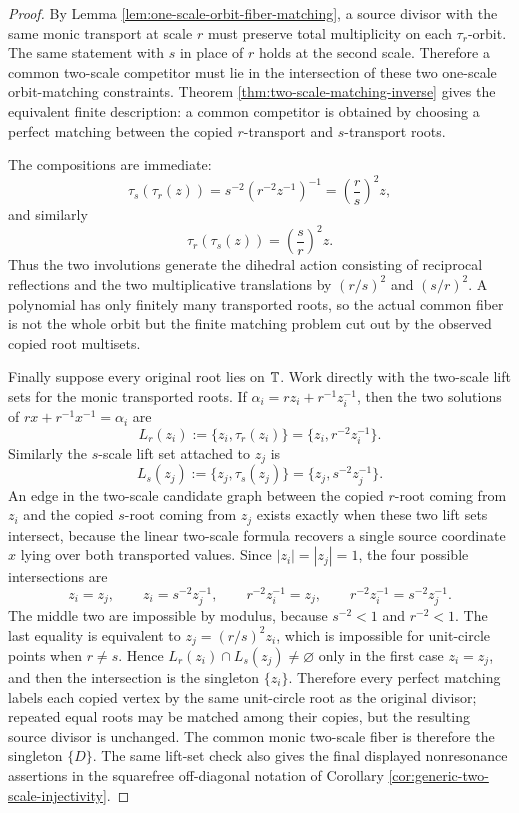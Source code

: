 \begin{proof}
By Lemma \ref{lem:one-scale-orbit-fiber-matching}, a source divisor
with the same monic transport at scale \(r\) must preserve total
multiplicity on each \(\tau_r\)-orbit.  The same statement with \(s\)
in place of \(r\) holds at the second scale.  Therefore a common
two-scale competitor must lie in the intersection of these two
one-scale orbit-matching constraints.  Theorem
\ref{thm:two-scale-matching-inverse} gives the equivalent finite
description: a common competitor is obtained by choosing a perfect
matching between the copied \(r\)-transport and \(s\)-transport roots.

The compositions are immediate:
\[
\tau_s(\tau_r(z))
=s^{-2}\left(r^{-2}z^{-1}\right)^{-1}
=\left(\frac r s\right)^2z,
\]
and similarly
\[
\tau_r(\tau_s(z))=\left(\frac s r\right)^2z.
\]
Thus the two involutions generate the dihedral action consisting of
reciprocal reflections and the two multiplicative translations by
\((r/s)^2\) and \((s/r)^2\).  A polynomial has only finitely many
transported roots, so the actual common fiber is not the whole orbit
but the finite matching problem cut out by the observed copied root
multisets.

Finally suppose every original root lies on \(\mathbb{T}\).  Work directly
with the two-scale lift sets for the monic transported roots.  If
\(\alpha_i=rz_i+r^{-1}z_i^{-1}\), then the two solutions of
\(rx+r^{-1}x^{-1}=\alpha_i\) are
\[
L_r(z_i):=\{z_i,\tau_r(z_i)\}
       =\{z_i,r^{-2}z_i^{-1}\}.
\]
Similarly the \(s\)-scale lift set attached to \(z_j\) is
\[
L_s(z_j):=\{z_j,\tau_s(z_j)\}
       =\{z_j,s^{-2}z_j^{-1}\}.
\]
An edge in the two-scale candidate graph between the copied
\(r\)-root coming from \(z_i\) and the copied \(s\)-root coming from
\(z_j\) exists exactly when these two lift sets intersect, because the
linear two-scale formula recovers a single source coordinate \(x\)
lying over both transported values.  Since \(|z_i|=|z_j|=1\), the four
possible intersections are
\[
z_i=z_j,\qquad
z_i=s^{-2}z_j^{-1},\qquad
r^{-2}z_i^{-1}=z_j,\qquad
r^{-2}z_i^{-1}=s^{-2}z_j^{-1}.
\]
The middle two are impossible by modulus, because \(s^{-2}<1\) and
\(r^{-2}<1\).  The last equality is equivalent to
\(z_j=(r/s)^2z_i\), which is impossible for unit-circle points when
\(r\ne s\).  Hence \(L_r(z_i)\cap L_s(z_j)\ne\varnothing\) only in the
first case \(z_i=z_j\), and then the intersection is the singleton
\(\{z_i\}\).  Therefore every perfect matching labels each copied
vertex by the same unit-circle root as the original divisor; repeated
equal roots may be matched among their copies, but the resulting
source divisor is unchanged.  The common monic two-scale fiber is
therefore the singleton \(\{D\}\).  The same lift-set check also gives
the final displayed nonresonance assertions in the squarefree
off-diagonal notation of Corollary
\ref{cor:generic-two-scale-injectivity}.
\end{proof}


